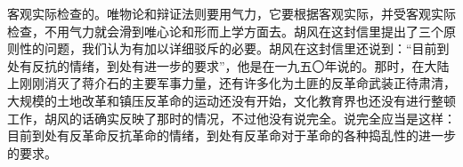 客观实际检查的。唯物论和辩证法则要用气力，它要根据客观实际，并受客观实际检查，不用气力就会滑到唯心论和形而上学方面去。胡风在这封信里提出了三个原则性的问题，我们认为有加以详细驳斥的必要。胡风在这封信里还说到：“目前到处有反抗的情绪，到处有进一步的要求”，他是在一九五〇年说的。那时，在大陆上刚刚消灭了蒋介石的主要军事力量，还有许多化为土匪的反革命武装正待肃清，大规模的土地改革和镇压反革命的运动还没有开始，文化教育界也还没有进行整顿工作，胡风的话确实反映了那时的情况，不过他没有说完全。说完全应当是这样：目前到处有反革命反抗革命的情绪，到处有反革命对于革命的各种捣乱性的进一步的要求。
